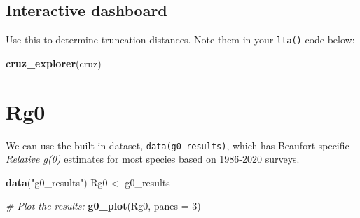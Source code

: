 \documentclass[
]{book}
\newenvironment{Shaded}{\begin{snugshade}}{\end{snugshade}}
\newcommand{\AttributeTok}[1]{\textcolor[rgb]{0.13,0.29,0.53}{#1}}
\newcommand{\CommentTok}[1]{\textcolor[rgb]{0.56,0.35,0.01}{\textit{#1}}}
\newcommand{\DecValTok}[1]{\textcolor[rgb]{0.00,0.00,0.81}{#1}}
\newcommand{\FunctionTok}[1]{\textcolor[rgb]{0.13,0.29,0.53}{\textbf{#1}}}
\newcommand{\NormalTok}[1]{#1}
\newcommand{\OtherTok}[1]{\textcolor[rgb]{0.56,0.35,0.01}{#1}}
\newcommand{\StringTok}[1]{\textcolor[rgb]{0.31,0.60,0.02}{#1}}
\begin{document}
\hypertarget{interactive-dashboard-1}{%
\subsection*{Interactive dashboard}\label{interactive-dashboard-1}}

Use this to determine truncation distances. Note them in your \texttt{lta()} code below:

\begin{Shaded}
\begin{Highlighting}[]
\FunctionTok{cruz\_explorer}\NormalTok{(cruz)}
\end{Highlighting}
\end{Shaded}

\hypertarget{rg0-1}{%
\section*{Rg0}\label{rg0-1}}

We can use the built-in dataset, \texttt{data(g0\_results)}, which has Beaufort-specific \emph{Relative g(0)} estimates for most species based on 1986-2020 surveys.

\begin{Shaded}
\begin{Highlighting}[]
\FunctionTok{data}\NormalTok{(}\StringTok{"g0\_results"}\NormalTok{)}
\NormalTok{Rg0 }\OtherTok{\textless{}{-}}\NormalTok{ g0\_results}
\end{Highlighting}
\end{Shaded}

\begin{Shaded}
\begin{Highlighting}[]
\CommentTok{\# Plot the results: }
\FunctionTok{g0\_plot}\NormalTok{(Rg0, }\AttributeTok{panes =} \DecValTok{3}\NormalTok{)}
\end{Highlighting}
\end{Shaded}
\end{document}
